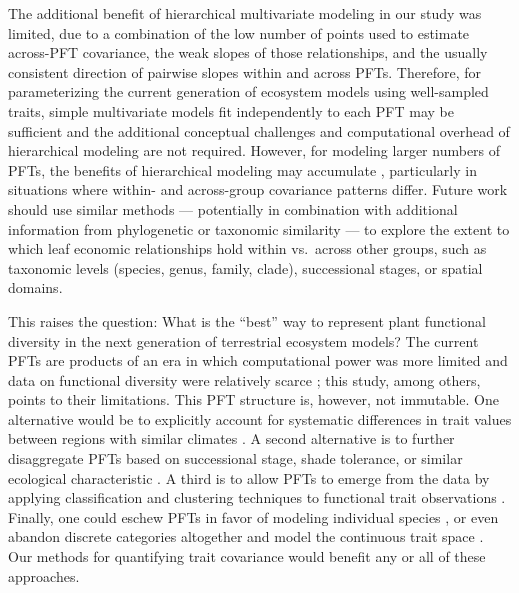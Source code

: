 \documentclass{article}
\begin{document}
The additional benefit of hierarchical multivariate modeling in our study was limited, due to a combination of the low number of points used to estimate across-PFT covariance, the weak slopes of those relationships, and the usually consistent direction of pairwise slopes within and across PFTs.
Therefore, for parameterizing the current generation of ecosystem models using well-sampled traits, simple multivariate models fit independently to each PFT may be sufficient and the additional conceptual challenges and computational overhead of hierarchical modeling are not required.
However, for modeling larger numbers of PFTs, the benefits of hierarchical modeling may accumulate \citep{dietze_2008_capturing,cressie_2009_accounting,webb_2010_structured,clark_2004_why}, particularly in situations where within- and across-group covariance patterns differ.
Future work should use similar methods --- potentially in combination with additional information from phylogenetic or taxonomic similarity \citep{symonds_2014_primer} --- to explore the extent to which leaf economic relationships hold within vs.\ across other groups, such as taxonomic levels (species, genus, family, clade), successional stages, or spatial domains.

This raises the question: What is the “best” way to represent plant functional diversity in the next generation of terrestrial ecosystem models?
The current PFTs are products of an era in which computational power was more limited and data on functional diversity were relatively scarce \citep{box_1995_factors,woodward_1996_pftintro,prentice_1992_special_paper}; this study, among others, points to their limitations.
This PFT structure is, however, not immutable.
One alternative would be to explicitly account for systematic differences in trait values between regions with similar climates \citep{butler_2017_mapping}.
A second alternative is to further disaggregate PFTs based on successional stage, shade tolerance, or similar ecological characteristic \citep{longo_2019_ed1,hickler_2011_projecting}.
A third is to allow PFTs to emerge from the data by applying classification and clustering techniques to functional trait observations \citep{boulangeat_2012_improving}.
Finally, one could eschew PFTs in favor of modeling individual species \citep{post_1996_linkages,weng_2015_scaling}, or even abandon discrete categories altogether and model the continuous trait space \citep{scheiter_2013_next}.
Our methods for quantifying trait covariance would benefit any or all of these approaches.
\end{document}
